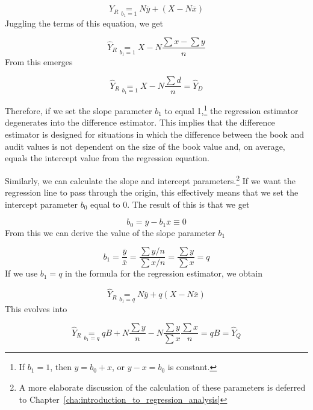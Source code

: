 \begin{equation*}
  \hat{Y}_R \underset{b_1 = 1}{=} N \overline{y} + (X - N \overline{x})
\end{equation*}
Juggling the terms of this equation, we get

\begin{equation*}
  \hat{Y}_R \underset{b_1 = 1}{=} X - N \frac{\sum{x} - \sum{y}}{n}
\end{equation*}
From this emerges

\begin{equation*}
  \hat{Y}_R \underset{b_1 = 1}{=} X - N \frac{\sum{d}}{n} = \hat{Y}_D
\end{equation*}

Therefore, if we set the slope parameter $b_1$ to equal 1,\footnote{If $b_1 = 1$, then $y = b_0 + x$, or $y - x = b_0$ is constant.} the regression estimator degenerates into the difference estimator. This implies that the difference estimator is designed for situations in which the difference between the book and audit values is not dependent on the size of the book value and, on average, equals the intercept value from the regression equation.

Similarly, we can calculate the slope and intercept parameters.\footnote{A more elaborate discussion of the calculation of these parameters is deferred to Chapter~\ref{cha:introduction_to_regression_analysis}} If we want the regression line to pass through the origin, this effectively means that we set the intercept parameter $b_0$ equal to 0. The result of this is that we get

\begin{equation*}
b_0 = \overline{y} - b_1 \overline{x} \equiv 0
\end{equation*}
From this we can derive the value of the slope parameter $b_1$

\begin{equation*}
b_1 = \frac{\overline{y}}{\overline{x}} = \frac{\sum{y}/n}{\sum{x}/n} =\frac{\sum{y}}{\sum{x}} = q
\end{equation*}
If we use $b_1 = q$ in the formula for the regression estimator, we obtain

\begin{equation*}
  \hat{Y}_R \underset{b_1 = q}{=} N \overline{y} + q(X - N \overline{x})
\end{equation*}
This evolves into

\begin{equation*}
  \hat{Y}_R \underset{b_1 = q}{=} qB + N \frac{\sum{y}}{n} - N \frac{\sum{y}}{\sum{x}} \frac{\sum{x}}{n} = qB = \hat{Y}_Q
\end{equation*}

